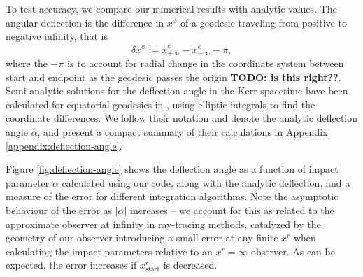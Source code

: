\documentclass[fleqn,usenatbib]{mnras}
\newcommand{\todo}[1]{{\noindent \bf \color{red} TODO: #1}}
\begin{document}
To test accuracy, we compare our numerical results with analytic values. The angular deflection is the difference in $x^\phi$ of a geodesic traveling from positive to negative infinity, that is
\begin{equation}
	\delta x^\phi :=
		x^\phi_{+\infty} - x^\phi_{-\infty}
		- \pi,
\end{equation}
where the $-\pi$ is to account for radial change in the coordinate system between start and endpoint as the geodesic passes the origin \todo{is this right??}. Semi-analytic solutions for the deflection angle in the Kerr spacetime have been calculated for equatorial geodesics in \cite{iyer_lights_2009}, using elliptic integrals to find the coordinate differences. We follow their notation and denote the analytic deflection angle $\hat{\alpha}$, and present a compact summary of their calculations in Appendix \ref{appendix:deflection-angle}.

Figure \ref{fig:deflection-angle} shows the deflection angle as a function of impact parameter $\alpha$ calculated using our code, along with the analytic deflection, and a measure of the error for different integration algorithms. Note the asymptotic behaviour of the error as $\lvert \alpha \rvert$ increases -- we account for this as related to the approximate observer at infinity in ray-tracing methods, catalyzed by the geometry of our observer introducing a small error at any finite $x^r$ when calculating the impact parameters relative to an $x^r = \infty$ observer. As can be expected, the error increases if $x^r_\text{start}$ is decreased.
\end{document}
